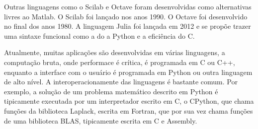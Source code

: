 Outras linguagens como o Scilab e Octave foram desenvolvidas como alternativas livres ao Matlab. O Scilab foi lançado nos anos 1990. O Octave foi desenvolvido no final dos anos 1980. A linguagem Julia foi lançada em 2012 e se propõe trazer uma sintaxe funcional como a do a Python e a eficiência do C. 

Atualmente, muitas aplicações são desenvolvidas em várias linguagens, a computação bruta, onde performace é crítica, é programada em C ou C++, enquanto a interface com o usuário é programada em Python ou outra linguagem de alto nível. A interoperacionamente das linguagens é bastante comum. Por exemplo, a solução de um problema matemático descrito em Python é tipicamente executada por um interpretador escrito em C, o CPython, que chama funções da biblioteca Laplack, escrita em Fortran, que por sua vez chama funções de uma biblioteca BLAS, tipicamente escrita em C e Assembly.

%
